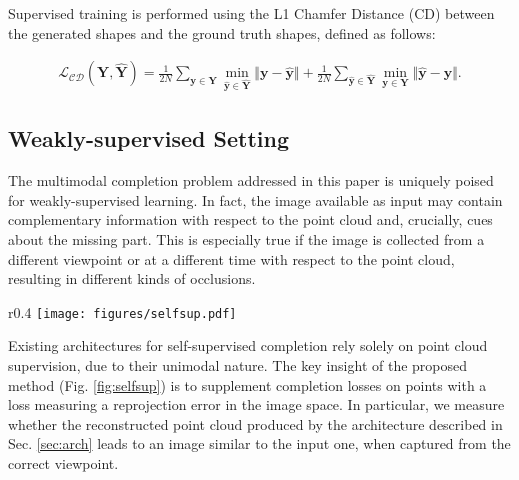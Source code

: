 \documentclass{article}
\newcommand{\yb}{\mathbf{y}}
\newcommand{\Yb}{\mathbf{Y}}
\begin{document}
Supervised training is performed using the L1 Chamfer Distance (CD) between the generated shapes and the ground truth shapes, defined as follows:

\begin{align}
    \label{eq:CD}
    \mathcal{L_\text{CD}}(\Yb, \hat{\Yb}) = \frac{1}{2N}\sum_{\yb \in \Yb} \min_{\hat{\yb} \in \hat{\Yb}} \Vert \yb-\hat{\yb} \Vert + \frac{1}{2N}\sum_{\hat{\yb} \in \hat{\Yb}} \min_{\yb \in \Yb} \Vert \hat{\yb}-\yb \Vert .
\end{align}


\subsection{Weakly-supervised Setting}

The multimodal completion problem addressed in this paper is uniquely poised for weakly-supervised learning. In fact, the image available as input may contain complementary information with respect to the point cloud and, crucially, cues about the missing part. This is especially true if the image is collected from a different viewpoint or at a different time with respect to the point cloud, resulting in different kinds of occlusions. 
\begin{wrapfigure}[12]{r}{0.4\textwidth}
\centering
 \texttt{[image: figures/selfsup.pdf]}
    \caption{Weakly-supervised training.}
  \label{fig:selfsup}
\end{wrapfigure}

Existing architectures for self-supervised completion \cite{crn} \cite{selfsup}  rely solely on point cloud supervision, due to their unimodal nature. The key insight of the proposed method (Fig. \ref{fig:selfsup}) is to supplement completion losses on points with a loss measuring a reprojection error in the image space. In particular, we measure whether the reconstructed point cloud produced by the architecture described in Sec. \ref{sec:arch} leads to an image similar to the input one, when captured from the correct viewpoint.
 
\end{document}
